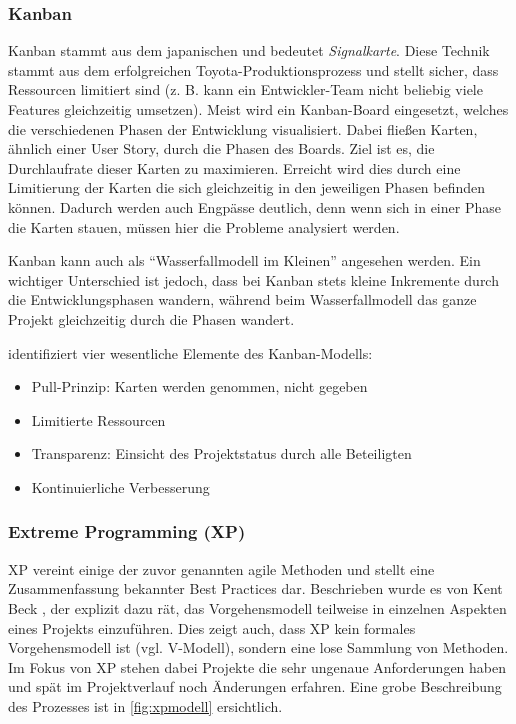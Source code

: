 \subsubsection{Kanban}

Kanban stammt aus dem japanischen und bedeutet \emph{Signalkarte}.
Diese Technik stammt aus dem erfolgreichen Toyota-Produktionsprozess und stellt sicher, dass Ressourcen limitiert sind (z. B. kann ein Entwickler-Team nicht beliebig viele Features gleichzeitig umsetzen).
Meist wird ein Kanban-Board eingesetzt, welches die verschiedenen Phasen der Entwicklung visualisiert.
Dabei fließen Karten, ähnlich einer User Story, durch die Phasen des Boards.
Ziel ist es, die Durchlaufrate dieser Karten zu maximieren.
Erreicht wird dies durch eine Limitierung der Karten die sich gleichzeitig in den jeweiligen Phasen befinden können.
Dadurch werden auch Engpässe deutlich, denn wenn sich in einer Phase die Karten stauen, müssen hier die Probleme analysiert werden.

Kanban kann auch als \enquote{Wasserfallmodell im Kleinen} angesehen werden.
Ein wichtiger Unterschied ist jedoch, dass bei Kanban stets kleine Inkremente durch die Entwicklungsphasen wandern, während beim Wasserfallmodell das ganze Projekt gleichzeitig durch die Phasen wandert.

\parencite[][S. 54]{Epping:2011aa} identifiziert vier wesentliche Elemente des Kanban-Modells:

\begin{itemize}
\item Pull-Prinzip: Karten werden genommen, nicht gegeben
\item Limitierte Ressourcen
\item Transparenz: Einsicht des Projektstatus durch alle Beteiligten
\item Kontinuierliche Verbesserung
\end{itemize}

\subsubsection{Extreme Programming (XP)}

XP vereint einige der zuvor genannten agile Methoden und stellt eine Zusammenfassung bekannter Best Practices dar.
Beschrieben wurde es von Kent Beck \parencite[][]{Beck:1999aa}, der explizit dazu rät, das Vorgehensmodell teilweise in einzelnen Aspekten eines Projekts einzuführen.
Dies zeigt auch, dass XP kein formales Vorgehensmodell ist (vgl. V-Modell), sondern eine lose Sammlung von Methoden.
Im Fokus von XP stehen dabei Projekte die sehr ungenaue Anforderungen haben und spät im Projektverlauf noch Änderungen erfahren.
Eine grobe Beschreibung des Prozesses ist in \autoref{fig:xpmodell} ersichtlich. 

